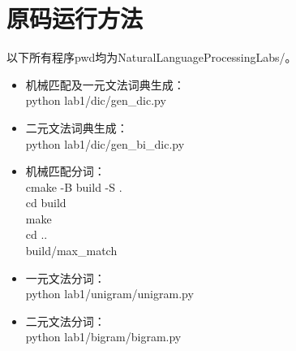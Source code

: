 \appendix

\section{原码运行方法}

以下所有程序pwd均为NaturalLanguageProcessingLabs/。

\begin{itemize}
  \item 机械匹配及一元文法词典生成：\\ python lab1/dic/gen\_dic.py
  \item 二元文法词典生成：\\ python lab1/dic/gen\_bi\_dic.py
  \item 机械匹配分词：\\ cmake -B build -S .\\ cd build\\ make\\ cd ..\\ build/max\_match
  \item 一元文法分词：\\ python lab1/unigram/unigram.py
  \item 二元文法分词：\\ python lab1/bigram/bigram.py
\end{itemize}
